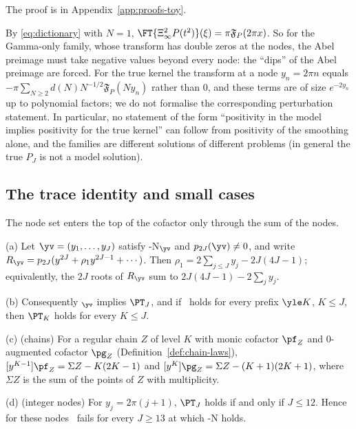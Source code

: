 The proof is in Appendix~\ref{app:proofs-toy}.

By \eqref{eq:dictionary} with $N=1$, $\FT{\Xi_\infty^2P(t^2)}(\xi)=\pi\mathfrak F_P(2\pi x)$. So for the Gamma-only family,
whose transform has double zeros at the nodes, the Abel preimage must take negative values beyond every node: the
``dips'' of the Abel preimage are forced. For the true kernel the transform at a node $y_n=2\pi n$ equals
$-\pi\sum_{N\ge2}d(N)N^{-1/2}\mathfrak F_P(Ny_n)$ rather than $0$, and these terms are of size $e^{-2y_n}$ up to
polynomial factors; we do not formalise the corresponding perturbation statement. In particular, no statement of
the form ``positivity in the model implies positivity for the true kernel'' can follow from positivity of the
smoothing alone, and the families are different solutions of different problems (in general the true $P_J$ is not
a model solution).

\subsection{The trace identity and small cases}\label{ssec:trace}

The node set enters the top of the cofactor only through the sum of the nodes.

\begin{lemma}\label{lem:trace}
\textup{(a)} Let $\yv=(y_1,\dots,y_J)$ satisfy \hyp{N}$_{\yv}$ and $p_{2J}(\yv)\neq0$, and write
$R_{\yv}=p_{2J}(y^{2J}+\rho_1y^{2J-1}+\cdots)$. Then $\rho_1=2\sum_{j\le J}y_j-2J(4J-1)$; equivalently, the $2J$ roots
of $R_{\yv}$ sum to $2J(4J-1)-2\sum_jy_j$.

\textup{(b)} Consequently \Rp$_{\yv}$ implies $\PT_J$, and if \Rp\ holds for every prefix $\yle K$, $K\le J$, then
$\PT_K$ holds for every $K\le J$.

\textup{(c)} \textup{(chains)} For a regular chain $Z$ of level $K$ with monic cofactor $\pf_Z$ and $0$-augmented
cofactor $\pg_Z$ \textup{(}Definition~\ref{def:chain-laws}\textup{)}, $[y^{K-1}]\pf_Z=\Sigma Z-K(2K-1)$ and
$[y^K]\pg_Z=\Sigma Z-(K+1)(2K+1)$, where $\Sigma Z$ is the sum of the points of $Z$ with multiplicity.

\textup{(d)} \textup{(integer nodes)} For $y_j=2\pi(j+1)$, $\PT_J$ holds if and only if $J\le 12$. Hence for these
nodes \Rp\ fails for every $J\ge13$ at which \hyp{N} holds.
\end{lemma}

